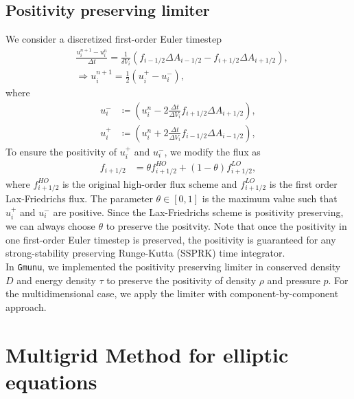 \subsection{Positivity preserving limiter}
We consider a discretized first-order Euler timestep
\begin{align}
    &\frac{u^{n+1}_i - u^n_i}{\Delta t} = \frac{1}{\delta V_i} 
    \left( f_{i-1/2} \Delta A_{i-1/2} - f_{i+1/2} \Delta A_{i+1/2} \right),\\
    &\Rightarrow u^{n+1}_i = \frac{1}{2}\left( u^{+}_i - u^-_i \right),
\end{align}
where
\begin{align}
    u^-_i &\coloneqq \left( u^n_i - 2\frac{\Delta t}{\Delta V_i} f_{i+1/2} \Delta A_{i+1/2} \right), \\
    u^+_i &\coloneqq \left( u^n_i + 2\frac{\Delta t}{\Delta V_i} f_{i-1/2} \Delta A_{i-1/2} \right),
\end{align}
To ensure the positivity of $u^+_i$ and $u^-_i$, we modify the flux as \cite{hu2013positivity}
\begin{align}
    f_{i+1/2} &= \theta f_{i+1/2}^{HO} + (1-\theta) f_{i+1/2}^{LO},
\end{align}
where $f_{i+1/2}^{HO}$ is the original high-order flux scheme
and $f_{i+1/2}^{LO}$ is the first order Lax-Friedrichs flux.
The parameter $\theta \in \left[0,1\right]$ is the maximum value such that
$u^+_i$ and $u^-_i$ are positive.
Since the Lax-Friedrichs scheme is positivity preserving,
we can always choose $\theta$ to preserve the positvity.
Note that once the positivity in one first-order Euler timestep is preserved,
the positivity is guaranteed for any strong-stability preserving Runge-Kutta (SSPRK) time integrator.\\
In \texttt{Gmunu}, we implemented the positivity preserving limiter in conserved density $D$
and energy density $\tau$ to preserve the positivity of density $\rho$ and pressure $p$.
For the multidimensional case, we apply the limiter with component-by-component approach.

\section{Multigrid Method for elliptic equations} %
\label{section3.1}

